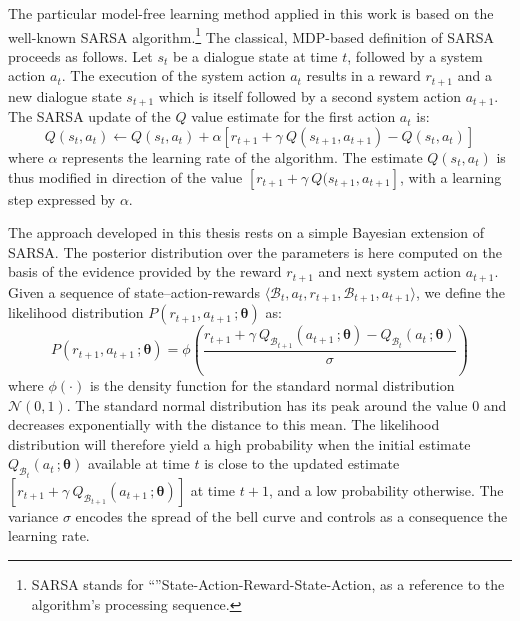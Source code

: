 The particular model-free learning method applied in this work is based on the well-known SARSA algorithm.\footnote{SARSA stands for ``''State-Action-Reward-State-Action, as a reference to the algorithm's processing sequence.} The classical, MDP-based definition of SARSA proceeds as follows. Let $s_t$ be a dialogue state at time $t$, followed by a system action $a_t$. The execution of the system action $a_t$ results in a reward $r_{t+1}$ and a new dialogue state $s_{t+1}$ which is itself followed by a second system action $a_{t+1}$.  The SARSA update of the $Q$ value estimate for the first action $a_t$ is:
\begin{equation}
Q(s_t, a_t) \leftarrow Q(s_t,a_t) + \alpha \left[r_{t+1} + \gamma \ Q(s_{t+1}, a_{t+1}) - Q(s_t, a_t) \right] 
\end{equation}
where $\alpha$ represents the learning rate of the algorithm. The estimate $Q(s_t, a_t)$ is thus modified in direction of the value $ \left[r_{t+1} + \gamma \ Q(s_{t+1}, a_{t+1} \right]$, with a learning step expressed by $\alpha$. 


The approach developed in this thesis rests on a simple Bayesian extension of SARSA.  The posterior distribution over the parameters is here computed on the basis of the evidence provided by the reward $r_{t+1}$ and next system action $a_{t+1}$.  Given a sequence of state--action-rewards $\langle \mathcal{B}_t, a_t, r_{t+1}, \mathcal{B}_{t+1}, a_{t+1} \rangle$, we define the likelihood distribution $P(r_{t+1}, a_{t+1} \,; \boldsymbol\theta)$ as:
\begin{equation}
P(r_{t+1}, a_{t+1} \,; \boldsymbol\theta) = \phi \left(\frac{r_{t+1} + \gamma \ Q_{\mathcal{B}_{t+1}} \left(a_{t+1} \,; \boldsymbol\theta\right) - Q_{\mathcal{B}_t}\left(a_t \,; \boldsymbol\theta\right)}{\sigma} \right) \label{eq:modelfreelikelihood}
\end{equation}
where $\phi(\cdot)$ is the density function for the standard normal distribution $\mathcal{N}(0, 1)$. The standard normal distribution has its peak around the value 0 and decreases exponentially with the distance to this mean. The likelihood distribution will therefore yield a high probability when the initial estimate 
$Q_{\mathcal{B}_t}(a_t \,; \boldsymbol\theta)$ available at time $t$ is close to the updated estimate $\left[r_{t+1} + \gamma \ Q_{\mathcal{B}_{t+1}} (a_{t+1} \,; \boldsymbol\theta) \right]$ at time $t+1$, and a low probability otherwise. The variance $\sigma$ encodes the spread of the bell curve and controls as a consequence the learning rate.

